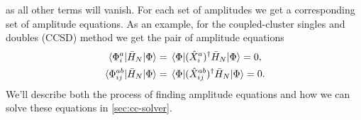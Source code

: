             as all other terms will vanish.
            For each set of amplitudes we get a corresponding set of amplitude
            equations.
            As an example, for the coupled-cluster singles and doubles (CCSD)
            method we get the pair of amplitude equations
            \begin{gather}
                \mel*{\Phi^{a}_{i}}{
                    \bar{H}_N
                }{\Phi}
                =
                \mel*{\Phi}{
                    (\hat{X}^{a}_{i})^{\dagger}
                    \bar{H}_N
                }{\Phi}
                = 0,
                \\
                \mel*{\Phi^{ab}_{ij}}{
                    \bar{H}_N
                }{\Phi}
                =
                \mel*{\Phi}{
                    (\hat{X}^{ab}_{ij})^{\dagger}
                    \bar{H}_N
                }{\Phi}
                = 0.
            \end{gather}
            We'll describe both the process of finding amplitude equations and
            how we can solve these equations in \autoref{sec:cc-solver}.



